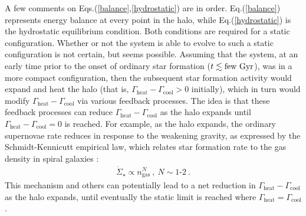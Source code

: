 \documentclass[12pt]{article}
\begin{document}
{{A few comments on Eqs.(\ref{balance},\ref{hydrostatic}) are in order. Eq.(\ref{balance}) represents energy balance at every point in the halo, while Eq.(\ref{hydrostatic}) is the hydrostatic equilibrium condition. Both conditions are required for a static configuration. Whether or not the system is able to evolve to such a static configuration is not certain, but seems possible. Assuming that the system, at an early time prior to the onset of ordinary star formation ($t \lesssim {\rm few} \ {\rm Gyr}$), was in a more compact configuration, then the subsequent star formation activity would expand and heat the halo (that is, $\Gamma _{\text{heat}} - \Gamma _{\text{cool}} > 0$ initially), which in turn would modify $\Gamma _{\text{heat}}-\Gamma _{\text{cool}}$ via various feedback processes. The idea is that these feedback processes can reduce $\Gamma _{\text{heat}} - \Gamma _{\text{cool}}$ as the halo expands until $\Gamma _{\text{heat}} - \Gamma _{\text{cool}} = 0$ is reached. For example, as the halo expands, the ordinary supernovae rate reduces in response to the weakening gravity, as expressed by the Schmidt-Kennicutt empirical law, which relates star formation rate to the gas density in spiral galaxies \cite{schmidt}:
%
\begin{eqnarray}
\dot{\Sigma} _{\star} \propto n _{\text{gas}} ^N \ , \ N \sim 1\text{-}2 \ .
\end{eqnarray}
%
This mechanism and others can potentially lead to a net reduction in $\Gamma _{\text{heat}} - \Gamma _{\text{cool}}$ as the halo expands, until eventually the static limit is reached where $\Gamma_{\text{heat}} = \Gamma_{\text{cool}}$.

}}
\end{document}
